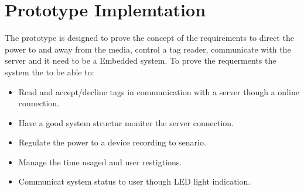 \section{Prototype Implemtation}
The prototype is designed to prove the concept of the requirements to direct the power to and away from the media, control a tag reader, communicate with the server and it need to be a Embedded system. \newline
To prove the requerments the system the to be able to: 

\begin{itemize}
	\item Read and accept/decline tags in communication with a server though a online connection.
	\item Have a good system structur moniter the server connection.
	\item Regulate the power to a device recording to senario.
	\item Manage the time usaged and user restigtions. 
	\item Communicat system status to user though LED light indication. 
\end{itemize}




    